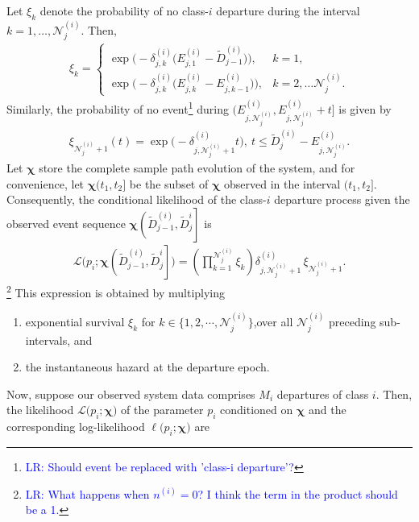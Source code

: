 \documentclass[11pt]{article}
\theoremstyle{remark}
\theoremstyle{definition}
\newcommand{\bs}[1]{{\boldsymbol #1 }}
\numberwithin{equation}{section}
\begin{document}
Let $\xi_k$ denote the probability of no class-$i$ departure during the interval $k=1,\ldots,\mathscr N^{(i)}_{j}$.
Then,
\begin{align*}
    \xi_k=\left\lbrace\begin{array}{cc}
        \exp\biggl(-\delta^{(i)}_{j,k} \Big(E^{(i)}_{j,1} - \widetilde{D}^{(i)}_{j-1}\Big)\biggr),  & k=1, \\
         \exp\biggl(-\delta^{(i)}_{j,k} \Big(E^{(i)}_{j,k} - E^{(i)}_{j,k-1}\Big)\biggr), &  k=2,\ldots \mathscr{N}^{(i)}_{j}.
    \end{array}\right .
\end{align*}
Similarly, the probability of no event\footnote{\textcolor{blue}{LR: Should event be replaced with 'class-i departure'?}} during $\bigg(E^{(i)}_{j,\mathscr N^{(i)}_{j}} ,E^{(i)}_{j,\mathscr N^{(i)}_{j}}+t\bigg]$ is given by
\begin{align*}
    \xi_{\mathscr{N}^{(i)}_{j}+1}(t)= \exp\biggl(-\delta^{(i)}_{j, \mathscr N^{(i)}_j+1} t\biggr), \ t\leq \widetilde{D}^{(i)}_{j}-E^{(i)}_{j,\mathscr N^{(i)}_{j}} .
\end{align*}
Let $\bs \chi$ store the complete sample path evolution of the system, and for convenience, let $\bs\chi\big(t_1, t_2\big]$ be the subset of $\bs\chi$ observed in the interval $\big(t_1, t_2\big]$.
Consequently, the conditional likelihood of the class-$i$ departure process given the observed event sequence $\bs\chi\left(\widetilde{D}^{(i)}_{j-1}, \widetilde{D}^{i}_j\right]$ is
\begin{align}\label{likelihood: one interdeparture time}
    \mathcal{L}\Big(p_i; \bs\chi\left(\widetilde{D}^{(i)}_{j-1}, \widetilde{D}^{i}_j\right]\Big) =    \left(\prod_{k=1}^{\mathscr{N}^{(i)}_{j}}\xi_k  \right) \delta^{(i)}_{j, \mathscr N^{(i)}_j+1} \, \xi_{\mathscr{N}^{(i)}_{j}+1}.
\end{align}
\footnote{\textcolor{blue}{LR: What happens when $n^{(i)}=0$? I think the term in the product should be a 1.}}
This expression is obtained by multiplying
\begin{enumerate}
    \item exponential survival $\xi_{k}$ for $k \in \Big\{1, 2, \cdots, \mathscr{N}^{(i)}_j\Big\}$,over all $\mathscr{N}^{(i)}_j$ preceding sub-intervals, and
    \item the instantaneous hazard at the departure epoch.
\end{enumerate}
Now, suppose our observed system data comprises $M_i$ departures of class $i$. 
Then, the likelihood $\mathcal{L}\big(p_i; \bs\chi\big)$ of the parameter $p_i$ conditioned on $\bs\chi$ and the corresponding log-likelihood $\ell\big(p_i;\bs\chi\big)$ are
\end{document}

